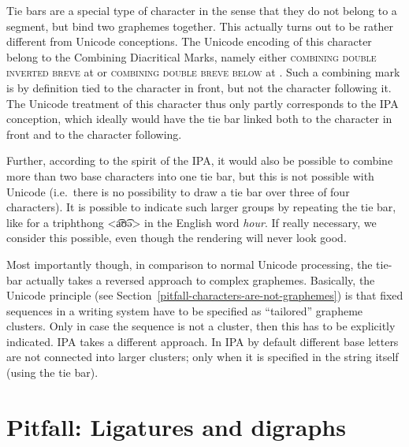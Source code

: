 Tie bars are a special type of character in the sense that they do not belong to
a segment, but bind two graphemes together. This actually turns out to be rather
different from Unicode conceptions. The Unicode encoding of this character
belong to the Combining Diacritical Marks, namely either \textsc{combining double
inverted breve} at  or \textsc{combining double breve below} at
. Such a combining mark is by definition tied to the character in
front, but not the character following it. The Unicode treatment of this
character thus only partly corresponds to the IPA conception, which ideally
would have the tie bar linked both to the character in front and to the
character following. 

Further, according to the spirit of the IPA, it would also be possible to
combine more than two base characters into one tie bar, but this is not possible
with Unicode (i.e.~there is no possibility to draw a tie bar over three of four
characters). It is possible to indicate such larger groups by repeating the tie
bar, like for a triphthong <a͡ʊ͡ə> in the English word \textit{hour}. If really
necessary, we consider this possible, even though the rendering will never look
good. 

Most importantly though, in comparison to normal Unicode processing, the tie-bar
actually takes a reversed approach to complex graphemes. Basically, the Unicode
principle (see Section~\ref{pitfall-characters-are-not-graphemes}) is that fixed
sequences in a writing system have to be specified as ``tailored'' grapheme
clusters. Only in case the sequence is not a cluster, then this has to be
explicitly indicated. IPA takes a different approach. In IPA by default
different base letters are not connected into larger clusters; only when it is
specified in the string itself (using the tie bar).

\section{Pitfall: Ligatures and digraphs}
\label{pitfall-ligatures-digraphs}     


